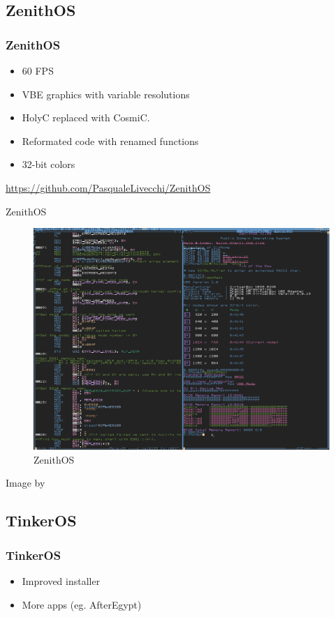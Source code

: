 \documentclass{beamer}
\begin{document}
{	\subsection{ZenithOS}
	\begin{frame}
		\frametitle{ZenithOS}
		\begin{itemize}
			\item 60 FPS

			\item VBE graphics with variable resolutions

			\item HolyC replaced with CosmiC.

			\item Reformated code with renamed functions

			\item 32-bit colors
		\end{itemize}
		\url{https://github.com/PasqualeLivecchi/ZenithOS}
	\end{frame}

	\begin{frame}{ZenithOS}
		\begin{figure}[h]
			\centering
			\includegraphics[width=0.6\linewidth]{images/zenith_os.png}
			\caption{ZenithOS}
			\label{fig:ZenithOS}
		\end{figure}
		Image by \cite{livecchi_pasqualelivecchizenithos_2024}
	\end{frame}

	\subsection{TinkerOS}
	\begin{frame}
		\frametitle{TinkerOS}
		\begin{itemize}
			\item Improved installer

			\item More apps (eg. AfterEgypt)


\end{itemize}
\end{frame}}
\end{document}
